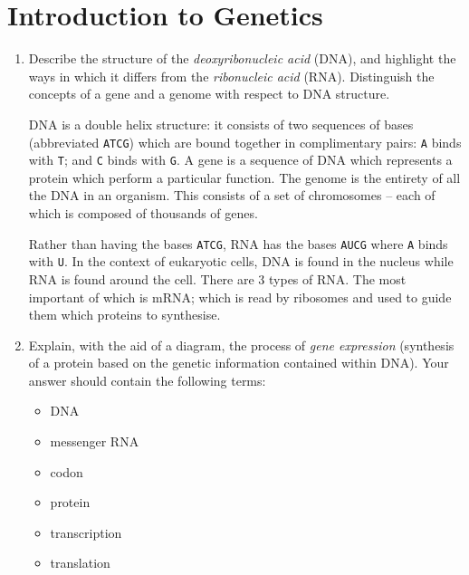 \documentclass[10pt,\jkfside,a4paper]{article}
\begin{document}
\section{Introduction to Genetics}

\begin{enumerate}

    \item Describe the structure of the \textit{deoxyribonucleic acid} (DNA), and highlight the ways in which it differs from the \textit{ribonucleic acid} (RNA). Distinguish the concepts of a gene and a genome
    with respect to DNA structure.

    DNA is a double helix structure: it consists of two sequences of bases (abbreviated \texttt{ATCG}) which are bound together in complimentary pairs: \texttt{A} binds with \texttt{T}; and \texttt{C} binds
    with \texttt{G}. A gene is a sequence of DNA which represents a protein which perform a particular function. The genome is the entirety of all the DNA in an organism. This consists of a set of chromosomes
    -- each of which is composed of thousands of genes.

    Rather than having the bases \texttt{ATCG}, RNA has the bases \texttt{AUCG} where \texttt{A} binds with \texttt{U}. In the context of eukaryotic cells, DNA is found in the nucleus while RNA is found around
    the cell. There are 3 types of RNA\@. The most important of which is mRNA; which is read by ribosomes and used to guide them which proteins to synthesise.

    \item Explain, with the aid of a diagram, the process of \textit{gene expression} (synthesis of a protein based on the genetic information contained within DNA). Your answer should contain the following terms:

    \begin{itemize}

        \item DNA

        \item messenger RNA

        \item codon

        \item protein

        \item transcription

        \item translation


\end{itemize}
\end{enumerate}
\end{document}
